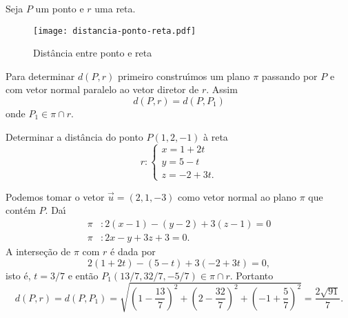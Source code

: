 Seja $P$ um ponto e $r$ uma reta.
\begin{figure}[h]
    \centering
    \caption{Dist\^ancia entre ponto e reta}
    \texttt{[image: distancia-ponto-reta.pdf]}

\end{figure}

Para determinar $d(P,r)$ primeiro constru{\'\i}mos um plano $\pi$ passando por $P$ e com vetor normal paralelo ao vetor diretor de $r$. Assim
\[
    d(P,r) = d(P,P_1)
\]
onde $P_1 \in \pi\cap r$.

\begin{exemplo}
    Determinar a dist\^ancia do ponto $P(1,2,-1)$ \`a reta
    \[
        r: \begin{cases}
            x = 1 + 2t\\
            y = 5 - t\\
            z = -2 + 3t.
        \end{cases}
    \]
    \begin{solucao}
        Podemos tomar o vetor $\vec{u} = (2,1,-3)$ como vetor normal ao plano $\pi$ que cont\'em $P$. Da{\'\i}
        \begin{align*}
            \pi &: 2(x - 1) - (y - 2) + 3(z - 1) = 0\\
            \pi &: 2x - y + 3z + 3 = 0.
        \end{align*}
        A interse\c{c}\~ao de $\pi$ com $r$ \'e dada por
        \[
            2(1 + 2t) - (5 - t) + 3(-2 + 3t) = 0,
        \]
        isto \'e, $t = 3/7$ e ent\~ao $P_1(13/7,32/7,-5/7) \in \pi\cap r$. Portanto
        \[
            d(P,r) = d(P,P_1) = \sqrt{\left(1 - \dfrac{13}{7}\right)^2 + \left(2 - \dfrac{32}{7}\right)^2 + \left(-1 + \dfrac{5}{7}\right)^2} = \dfrac{2\sqrt{91}}{7}.
        \]
    \end{solucao}
\end{exemplo}


